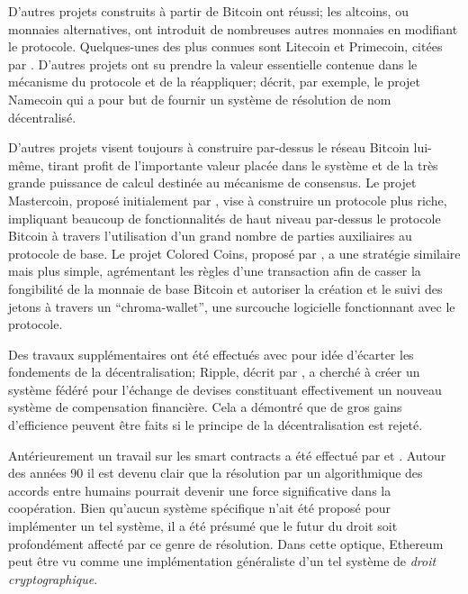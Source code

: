 \documentclass[9pt,oneside]{amsart}
\begin{document}
\begin{multicols}{2}
D'autres projets construits à partir de Bitcoin ont réussi; les altcoins, ou monnaies alternatives, ont introduit de nombreuses autres monnaies en modifiant le protocole. Quelques-unes des plus connues sont Litecoin et Primecoin, citées par \cite{sprankel2013technical}. D'autres projets ont su prendre la valeur essentielle contenue dans le mécanisme du protocole et de la réappliquer; \cite{aron2012bitcoin} décrit, par exemple, le projet Namecoin qui a pour but de fournir un système de résolution de nom décentralisé.

D'autres projets visent toujours à construire par-dessus le réseau Bitcoin lui-même, tirant profit de l’importante valeur placée dans le système et de la très grande puissance de calcul destinée au mécanisme de consensus. Le projet Mastercoin, proposé initialement par \cite{mastercoin2013willett}, vise à construire un protocole plus riche, impliquant beaucoup de fonctionnalités de haut niveau par-dessus le protocole Bitcoin à travers l'utilisation d'un grand nombre de parties auxiliaires au protocole de base. Le projet Colored Coins, proposé par \cite{colouredcoins2012rosenfeld}, a une stratégie similaire mais plus simple, agrémentant les règles d'une transaction afin de casser la fongibilité de la monnaie de base Bitcoin et autoriser la création  et le suivi des jetons à travers un ``chroma-wallet'', une surcouche logicielle fonctionnant avec le protocole.

Des travaux supplémentaires ont été effectués avec pour idée d'écarter les fondements de la décentralisation; Ripple, décrit par \cite{boutellier2014pirates}, a cherché à créer un système fédéré pour l'échange de devises constituant effectivement un nouveau système de compensation financière. Cela a démontré que de gros gains d'efficience peuvent être faits si le principe de la décentralisation est rejeté.

Antérieurement un travail sur les smart contracts a été effectué par \cite{szabo1997formalizing} et \cite{miller1997future}. Autour des années 90 il est devenu clair que la résolution par un algorithmique des accords entre humains pourrait devenir une force significative dans la coopération. Bien qu'aucun système spécifique n'ait été proposé pour implémenter un tel système, il a été présumé que le futur du droit soit profondément affecté par ce genre de résolution. Dans cette optique, Ethereum peut être vu comme une implémentation généraliste d'un tel système de \textit{droit cryptographique}.



\end{multicols}
\end{document}
